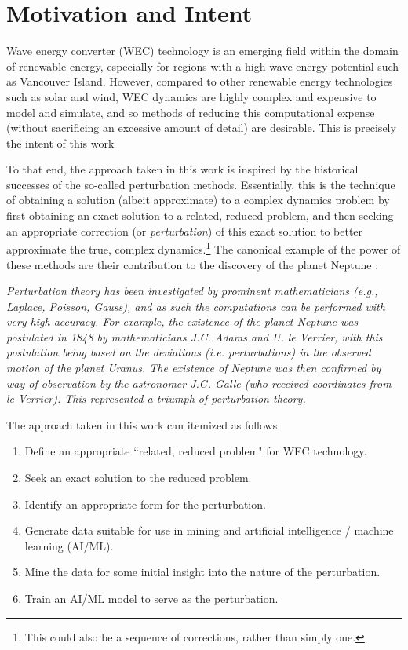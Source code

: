 \chapter{Motivation and Intent}

Wave energy converter (WEC) technology is an emerging field within the domain of renewable energy, especially for regions with a high wave energy potential such as Vancouver Island. However, compared to other renewable energy technologies such as solar and wind, WEC dynamics are highly complex and expensive to model and simulate, and so methods of reducing this computational expense (without sacrificing an excessive amount of detail) are desirable. This is precisely the intent of this work \par 
To that end, the approach taken in this work is inspired by the historical successes of the so-called perturbation methods. Essentially, this is the technique of obtaining a solution (albeit approximate) to a complex dynamics problem by first obtaining an exact solution to a related, reduced problem, and then seeking an appropriate correction (or \textit{perturbation}) of this exact solution to better approximate the true, complex dynamics.\footnote{This could also be a sequence of corrections, rather than simply one.} The canonical example of the power of these methods are their contribution to the discovery of the planet Neptune \cite{Bogolyubov_2024}:\par
\vspace{4mm}
\begin{small}
\textit{Perturbation theory has been investigated by prominent mathematicians (e.g., Laplace, Poisson, Gauss), and as such the computations can be performed with very high accuracy. For example, the existence of the planet Neptune was postulated in 1848 by mathematicians J.C. Adams and U. le Verrier, with this postulation being based on the deviations (i.e. perturbations) in the observed motion of the planet Uranus. The existence of Neptune was then confirmed by way of observation by the astronomer J.G. Galle (who received coordinates from le Verrier). This represented a triumph of perturbation theory.}
\end{small}\par 
\vspace{4mm}
\noindent The approach taken in this work can itemized as follows

\begin{enumerate}
	\item Define an appropriate ``related, reduced problem" for WEC technology.
	\item Seek an exact solution to the reduced problem.
	\item Identify an appropriate form for the perturbation.
	\item Generate data suitable for use in mining and artificial intelligence / machine learning (AI/ML).
	\item Mine the data for some initial insight into the nature of the perturbation.
	\item Train an AI/ML model to serve as the perturbation.
\end{enumerate}